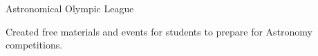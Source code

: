 \entryItem
	{Astronomical Olympic League}
	{}

	\begin{items}
		\item Created free materials and events for students to prepare for Astronomy competitions.
	\end{items}